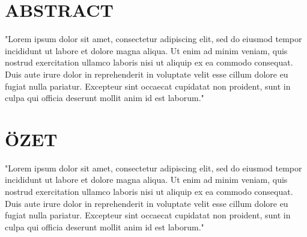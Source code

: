 \chapter*{ABSTRACT\\ \ttitle}

"Lorem ipsum dolor sit amet, consectetur adipiscing elit, sed do eiusmod tempor incididunt ut labore et dolore magna aliqua. Ut enim ad minim
veniam, quis nostrud exercitation ullamco laboris nisi ut aliquip ex ea commodo consequat. Duis aute irure dolor in reprehenderit in
voluptate velit esse cillum dolore eu fugiat nulla pariatur. Excepteur sint occaecat cupidatat non proident, sunt in culpa qui officia
deserunt mollit anim id est laborum."


\newpage

\chapter*{ÖZET\\ \ttitletr}

"Lorem ipsum dolor sit amet, consectetur adipiscing elit, sed do eiusmod tempor incididunt ut labore et dolore magna aliqua. Ut enim ad minim
veniam, quis nostrud exercitation ullamco laboris nisi ut aliquip ex ea commodo consequat. Duis aute irure dolor in reprehenderit in
voluptate velit esse cillum dolore eu fugiat nulla pariatur. Excepteur sint occaecat cupidatat non proident, sunt in culpa qui officia
deserunt mollit anim id est laborum."
